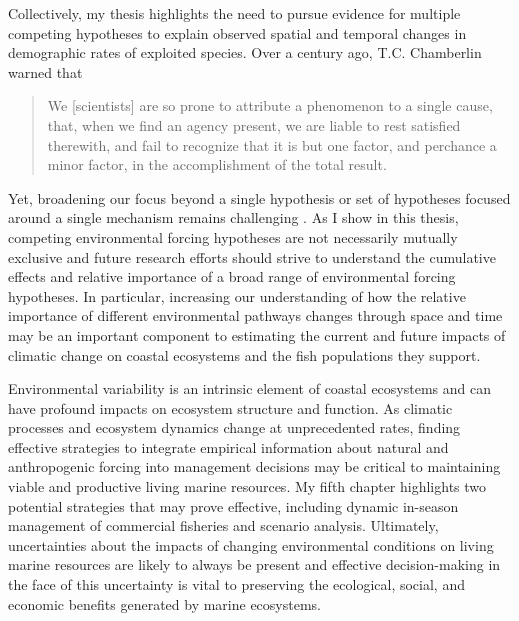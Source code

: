 Collectively, my thesis highlights the need to pursue evidence for multiple
competing hypotheses to explain observed spatial and temporal changes in
demographic rates of exploited species. Over a century ago, T.C. Chamberlin
warned that
\begin{quote}
We [scientists] are so prone to attribute a phenomenon to a single
cause, that, when we find an agency present, we are liable to rest satisfied
therewith, and fail to recognize that it is but one factor, and perchance a
minor factor, in the accomplishment of the total result. \citep{Chamberlin1965}
\end{quote}
Yet, broadening our focus beyond a single hypothesis or set of hypotheses
focused around a single mechanism remains challenging \citep{Hare2014}. As I
show in this thesis, competing environmental forcing hypotheses are not
necessarily mutually exclusive and future research efforts should strive to
understand the cumulative effects and relative importance of a broad range of
environmental forcing hypotheses. In particular, increasing our understanding of
how the relative importance of different environmental pathways changes through
space and time may be an important component to estimating the current and
future impacts of climatic change on coastal ecosystems and the fish populations
they support.

Environmental variability is an intrinsic element of coastal ecosystems and can
have profound impacts on ecosystem structure and function. As climatic processes
and ecosystem dynamics change at unprecedented rates, finding effective
strategies to integrate empirical information about natural and anthropogenic
forcing into management decisions may be critical to maintaining viable and
productive living marine resources. My fifth chapter highlights two potential
strategies that may prove effective, including dynamic in-season management of
commercial fisheries and scenario analysis. Ultimately, uncertainties about the
impacts of changing environmental conditions on living marine resources are
likely to always be present and effective decision-making in the face of this
uncertainty is vital to preserving the ecological, social, and economic benefits
generated by marine ecosystems.


